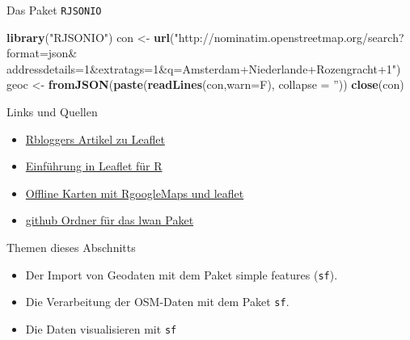 \documentclass[ignorenonframetext,]{beamer}
\newenvironment{Shaded}{\begin{snugshade}}{\end{snugshade}}
\newcommand{\KeywordTok}[1]{\textcolor[rgb]{0.13,0.29,0.53}{\textbf{#1}}}
\newcommand{\DataTypeTok}[1]{\textcolor[rgb]{0.13,0.29,0.53}{#1}}
\newcommand{\StringTok}[1]{\textcolor[rgb]{0.31,0.60,0.02}{#1}}
\newcommand{\NormalTok}[1]{#1}
\providecommand{\tightlist}{%
  \setlength{\itemsep}{0pt}\setlength{\parskip}{0pt}}
\begin{document}
\begin{frame}[fragile]{Das Paket \texttt{RJSONIO}}

\begin{Shaded}
\begin{Highlighting}[]
\KeywordTok{library}\NormalTok{(}\StringTok{"RJSONIO"}\NormalTok{)}
\NormalTok{con <-}\StringTok{ }\KeywordTok{url}\NormalTok{(}\StringTok{"http://nominatim.openstreetmap.org/search?format=json&}
\StringTok{addressdetails=1&extratags=1&q=Amsterdam+Niederlande+Rozengracht+1"}\NormalTok{)}
\NormalTok{geoc <-}\StringTok{ }\KeywordTok{fromJSON}\NormalTok{(}\KeywordTok{paste}\NormalTok{(}\KeywordTok{readLines}\NormalTok{(con,}\DataTypeTok{warn=}\NormalTok{F), }
                       \DataTypeTok{collapse =} \StringTok{''}\NormalTok{))}
\KeywordTok{close}\NormalTok{(con)}
\end{Highlighting}
\end{Shaded}

\end{frame}

\begin{frame}{Links und Quellen}

\begin{itemize}
\item
  \href{http://www.r-bloggers.com/the-leaflet-package-for-online-mapping-in-r/}{Rbloggers
  Artikel zu Leaflet}
\item
  \href{https://rstudio.github.io/leaflet/}{Einführung in Leaflet für R}
\item
  \href{https://blog.hwr-berlin.de/codeandstats/category/scientific-software/r/}{Offline
  Karten mit RgoogleMaps und leaflet}
\item
  \href{https://github.com/ropensci/lawn}{github Ordner für das lwan
  Paket}
\end{itemize}

\end{frame}

\begin{frame}[fragile]{Themen dieses Abschnitts}

\begin{itemize}
\tightlist
\item
  Der Import von Geodaten mit dem Paket simple features (\texttt{sf}).
\item
  Die Verarbeitung der OSM-Daten mit dem Paket \texttt{sf}.
\item
  Die Daten visualisieren mit \texttt{sf}
\end{itemize}

\end{frame}
\end{document}
